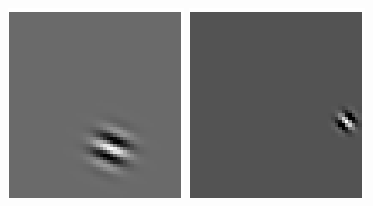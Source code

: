 \begin{figure}
\begin{center}
\includegraphics[width=\textwidth/9]{ch4/figures/Gabor3.png}
\includegraphics[width=\textwidth/9]{ch4/figures/Gabor4.png}

\end{center}
\end{figure}
